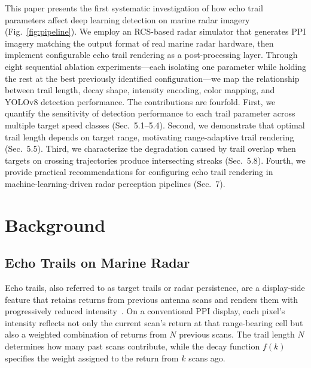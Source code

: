 \documentclass[colorlinks,upint,balance]{asmeconf}
\begin{document}
This paper presents the first systematic investigation of how echo trail parameters affect deep learning detection on marine radar imagery (Fig.~\ref{fig:pipeline}). We employ an RCS-based radar simulator that generates PPI imagery matching the output format of real marine radar hardware, then implement configurable echo trail rendering as a post-processing layer. Through eight sequential ablation experiments---each isolating one parameter while holding the rest at the best previously identified configuration---we map the relationship between trail length, decay shape, intensity encoding, color mapping, and YOLOv8 detection performance. The contributions are fourfold. First, we quantify the sensitivity of detection performance to each trail parameter across multiple target speed classes (Sec.~5.1--5.4). Second, we demonstrate that optimal trail length depends on target range, motivating range-adaptive trail rendering (Sec.~5.5). Third, we characterize the degradation caused by trail overlap when targets on crossing trajectories produce intersecting streaks (Sec.~5.8). Fourth, we provide practical recommendations for configuring echo trail rendering in machine-learning-driven radar perception pipelines (Sec.~7).


\section{Background}

\subsection{Echo Trails on Marine Radar}

Echo trails, also referred to as target trails or radar persistence, are a display-side feature that retains returns from previous antenna scans and renders them with progressively reduced intensity~\cite{Briggs2004RadarDisplay}. On a conventional PPI display, each pixel's intensity reflects not only the current scan's return at that range-bearing cell but also a weighted combination of returns from $N$ previous scans. The trail length $N$ determines how many past scans contribute, while the decay function $f(k)$ specifies the weight assigned to the return from $k$ scans ago.
\end{document}
